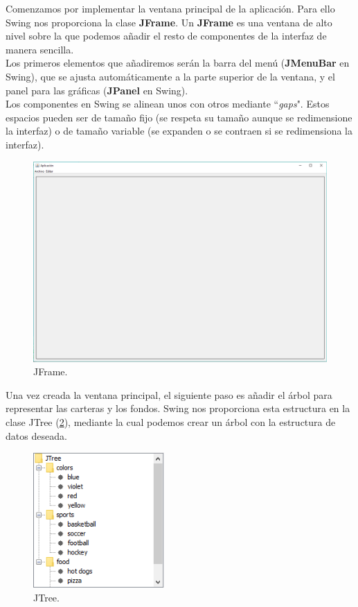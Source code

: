 \documentclass[12pt, a4paper]{book}
\begin{document}
Comenzamos por implementar la ventana principal de la aplicación. Para ello Swing nos proporciona la clase \textbf{JFrame}. Un \textbf{JFrame} es una ventana de alto nivel sobre la que podemos añadir el resto de componentes de la interfaz de manera sencilla.
\\

Los primeros elementos que añadiremos serán la barra del menú (\textbf{JMenuBar} en Swing), que se ajusta automáticamente a la parte superior de la ventana, y el panel para las gráficas (\textbf{JPanel} en Swing).
\\

Los componentes en Swing se alinean unos con otros mediante ``\textit{gaps}". Estos espacios pueden ser de tamaño fijo (se respeta su tamaño aunque se redimensione la interfaz) o de tamaño variable (se expanden o se contraen si se redimensiona la interfaz).

\begin{figure}[htbp]
	\centering
	\includegraphics[width=\textwidth]{figuras/gui1.PNG}
	\caption{JFrame.}
	\label{fig:gui1}
	\end {figure}


\newpage


Una vez creada la ventana principal, el siguiente paso es añadir el árbol para representar las carteras y los fondos. Swing nos proporciona esta estructura en la clase JTree (\ref{fig:JTree}), mediante la cual podemos crear un árbol con la estructura de datos deseada.\\


\begin{figure}[htbp]
	\centering
	\includegraphics[width=5cm]{figuras/JTree.PNG}
	\caption{JTree.}
	\label{fig:JTree}
	\end {figure}
\end{document}

